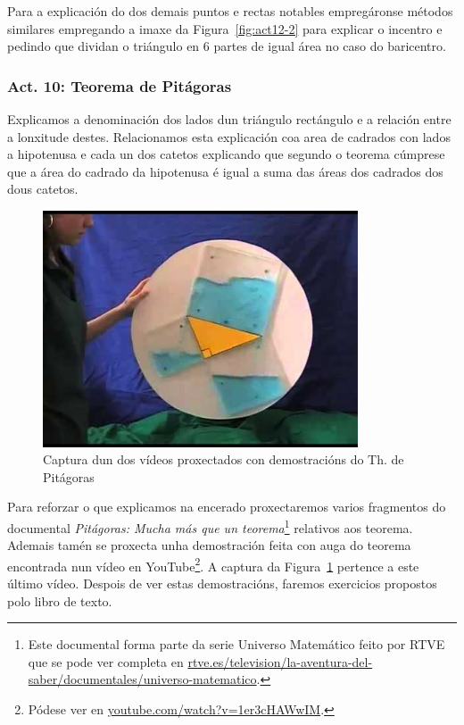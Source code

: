 Para a explicación do dos demais puntos e rectas notables empregáronse métodos similares empregando a imaxe da Figura~\ref{fig:act12-2} para explicar o incentro e pedindo que dividan o triángulo en 6 partes de igual área no caso do baricentro.

\subsubsection{Act. 10: Teorema de Pitágoras}\label{act10}
Explicamos a denominación dos lados dun triángulo rectángulo e a relación entre a lonxitude destes. Relacionamos esta explicación coa area de cadrados con lados a hipotenusa e cada un dos catetos explicando que segundo o teorema cúmprese que a área do cadrado da hipotenusa é igual a suma das áreas dos cadrados dos dous catetos.

\begin{figure}[h!]
  \centering
  \includegraphics[height=7cm]{img/pitagoras.jpg}
  \caption{Captura dun dos vídeos proxectados con demostracións do Th. de Pitágoras}\label{fig:act10}
\end{figure}

Para reforzar o que explicamos na encerado proxectaremos varios fragmentos do documental \emph{Pitágoras: Mucha más que un teorema}\footnote{Este documental forma parte da serie Universo Matemático feito por RTVE que se pode ver completa en \href{http://www.rtve.es/television/la-aventura-del-saber/documentales/universo-matematico/}{rtve.es/television/la-aventura-del-saber/documentales/universo-matematico}.} relativos aos teorema. Ademais tamén se proxecta unha demostración feita con auga do teorema encontrada nun vídeo en YouTube\footnote{Pódese ver en \href{https://www.youtube.com/watch?v=1er3cHAWwIM}{youtube.com/watch?v=1er3cHAWwIM}.}. A captura da Figura~\ref{fig:act10} pertence a este último vídeo. Despois de ver estas demostracións, faremos exercicios propostos polo libro de texto.

